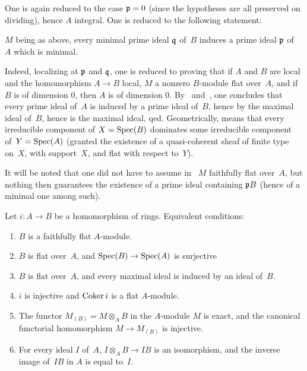 One
is again reduced to the case $\mathfrak{p}=0$ (since the hypotheses are
all preserved on dividing), hence $A$ integral. One is reduced to the
following statement:

\begin{corollary}
\label{IV.2.5}
$M$ being as above, every minimal prime ideal $\mathfrak{q}$ of~$B$
induces a prime ideal $\mathfrak{p}$ of~$A$ which is minimal.
\end{corollary}

Indeed, localizing at $\mathfrak{p}$ and $\mathfrak{q}$, one is reduced to
proving that if $A$ and $B$ are local and the homomorphism $A \to B$
local, $M$ a nonzero $B$-module flat over~$A$, and if $B$ is of
dimension $0$, then $A$ is of dimension $0$. By~
and~, one concludes that every prime ideal of~$A$ is
induced by a prime ideal of~$B$, hence by the maximal ideal of~$B$,
hence is the maximal ideal, qed. Geometrically,  means
that every irreducible component of $X=\operatorname{Spec} (B)$ dominates some
irreducible component of~$Y=\operatorname{Spec} (A)$ (granted the existence of a
quasi-coherent sheaf of finite type on~$X$, with support~$X$, and flat
with respect to~$Y$).

It will be noted that one did not have to assume in~ $M$
faithfully flat over~$A$, but nothing then guarantees the existence of
a prime ideal containing $\mathfrak{p}B$ (hence of a minimal one among
such).

\begin{proposition}
\label{IV.2.6}
Let $i \colon A \to B$ be a homomorphism of rings. Equivalent
conditions:
\begin{enumerate}\item[(i)] $B$ is a faithfully flat $A$-module.
\item[(ii)] $B$ is flat over~$A$, and $\Spec (B) \to \Spec (A)$ is
surjective
\item[(ii~bis)] $B$ is flat over~$A$, and every maximal ideal is
induced by an ideal of~$B$.
\item[(iii)] $i$ is injective and $\operatorname{Coker} i$ is a flat $A$-module.
\item[(iv)] The functor $M_{(B)}=M \otimes_{A} B$ in the $A$-module
$M$ is exact, and the canonical functorial homomorphism $M \to
M_{(B)}$ is injective.
\item[(iv~bis)] For every ideal $I$ of~$A$, $I \otimes_{A} B \to IB$
is an isomorphism, and the inverse image of~$IB$ in $A$ is equal
to~$I$.
\end{enumerate}
\end{proposition}

